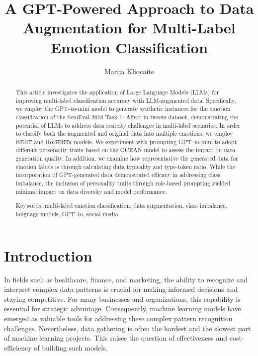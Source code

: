 \documentclass[manuscript]{clv3}
\begin{document}
\clearpage
\let\cleardoublepage\clearpage


\title{A GPT-Powered Approach to Data
Augmentation for Multi-Label
Emotion Classification}

\author{Marija Kliocaite}

\maketitle


\begin{abstract}
This article investigates the application of Large Language Models (LLMs) for improving multi-label classification accuracy with LLM-augmented data. Specifically, we employ the GPT-4o-mini model to generate synthetic instances for the emotion classification of the SemEval-2018 Task 1: Affect in tweets dataset, demonstrating the potential of LLMs to address data scarcity challenges in multi-label scenarios. In order to classify both the augmented and original data into multiple emotions, we employ BERT and RoBERTa models. We experiment with prompting GPT-4o-mini to adopt different personality traits based on the OCEAN model to assess the impact on data generation quality. In addition, we examine how representative the generated data for emotion labels is through calculating data typicality and type-token ratio. While the incorporation of GPT-generated data demonstrated efficacy in addressing class imbalance, the inclusion of personality traits through role-based prompting yielded minimal impact on data diversity and model performance.

Keywords: multi-label emotion classification, data augmentation, class imbalance, language models, GPT-4o, social media
\end{abstract}

\section{Introduction}

In fields such as healthcare, finance, and marketing, the ability to recognize and interpret complex data patterns is crucial for making informed decisions and staying competitive. For many businesses and organizations, this capability is essential for strategic advantage. Consequently, machine learning models have emerged as valuable tools for addressing these complex pattern recognition challenges. Nevertheless, data gathering is often the hardest and the slowest part of machine learning projects. This raises the question of effectiveness and cost-efficiency of building such models.
\end{document}
